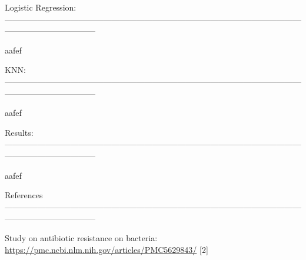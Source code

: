 \documentclass[100pt]{article}
\begin{document}
\begin{normalsize}\color {bluino}
\hfill\break
\noindent Logistic Regression:\\
---------------------------------------------------------------------------------------------------------------------------------------------
\end{normalsize}

\begin{normalsize}

aafef

\end{normalsize}

\begin{normalsize}\color {bluino}
\hfill\break
\noindent KNN:\\
---------------------------------------------------------------------------------------------------------------------------------------------
\end{normalsize}

\begin{normalsize}

aafef

\end{normalsize}

\begin{normalsize}\color {bluino}
\hfill\break
\noindent Results:\\
---------------------------------------------------------------------------------------------------------------------------------------------
\end{normalsize}

\begin{normalsize}

aafef

\end{normalsize}

\begin{normalsize}\color {bluino}
\hfill\break
\noindent References\\
---------------------------------------------------------------------------------------------------------------------------------------------
\end{normalsize}

\begin{normalsize}

\noindent[1] Study on antibiotic resistance on bacteria: \url{https://pmc.ncbi.nlm.nih.gov/articles/PMC5629843/}
[2] 

\end{normalsize}





\end{document}

